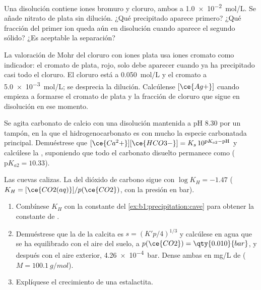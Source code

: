 \begin{exercise}[$\star\star$]\label{exo:b1:precipitation:7}
Una disolución contiene iones bromuro y cloruro, ambos a
\qty{1.0e-2}{mol/L}. Se añade nitrato de plata sin dilución. ¿Qué
precipitado aparece primero? ¿Qué fracción del primer ion queda aún en
disolución cuando aparece el segundo sólido? ¿Es aceptable la
separación?
\end{exercise}

\begin{exercise}[$\star\star$]\label{exo:b1:precipitation:8}
La valoración de Mohr del cloruro con iones plata usa iones cromato como
indicador: el cromato de plata, rojo, solo debe aparecer cuando ya ha
precipitado casi todo el cloruro. El cloruro está a \qty{0.050}{mol/L} y
el cromato a \qty{5.0e-3}{mol/L}; se desprecia la dilución. Calcúlense
$[\ce{Ag+}]$ cuando empieza a formarse el cromato de plata y la fracción
de cloruro que sigue en disolución en ese momento.
\end{exercise}

\begin{exercise}[$\star\star$]\label{exo:b1:precipitation:9}
Se agita carbonato de calcio con una disolución mantenida a pH 8.30 por
un tampón, en la que el hidrogenocarbonato es con mucho la especie
carbonatada principal. Demuéstrese que
$[\ce{Ca^2+}][\ce{HCO3-}] = K_s\,10^{\mathrm{p}K_{a2} - \mathrm{pH}}$ y
calcúlese la , suponiendo que todo el carbonato disuelto
permanece como  ($\mathrm{p}K_{a2} = 10.33$).
\end{exercise}

\begin{exercise}[$\star\star\star$]\label{exo:b1:precipitation:10}
Las cuevas calizas. La  del dióxido de carbono sigue
 con $\log K_H = -1.47$ ($K_H =
[\ce{CO2(aq)}]/p(\ce{CO2})$, con la presión en bar).
\begin{enumerate}
  \item Combínese $K_H$ con la constante del
        \cref{ex:b1:precipitation:cave} para obtener la constante de
        .
  \item Demuéstrese que la  de la calcita es $s = (K'p/4)^{1/3}$
        y calcúlese en agua que se ha equilibrado con el aire del suelo, a
        $p(\ce{CO2}) = \qty{0.010}{bar}$, y después con el aire exterior,
        \qty{4.26e-4}{bar}. Dense ambas en \unit{mg/L} de 
        ($M = \qty{100.1}{g/mol}$).
  \item Explíquese el crecimiento de una estalactita.
\end{enumerate}
\end{exercise}

